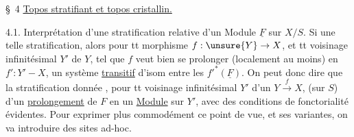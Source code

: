 \S\ 4 \uline{Topos stratifiant et topos cristallin.}

4.1. Interprétation d'une stratification relative d'un Module $\underline{F}$ sur $X/S$.
Si  une telle stratification, alors pour tt morphisme $f:\unsure{Y}\to X$, et tt voisinage infinitésimal $Y'$ de $Y$,   tel que $f$ veut bien se prolonger (localement au moins) en $f':Y'\mathbin{-}X$, un système \uline{transitif} d'isom entre les $f'^*(\underline{F})$.
On peut donc dire que la   stratification   donnée , pour tt voisinage infinitésimal $Y'$ d'un $Y\xrightarrow{f}X$, (sur $S$)  d'un \uline{prolongement}  de $F$ en un \uline{Module} sur $Y'$, avec des conditions de fonctorialité évidentes.
Pour exprimer plus commodément ce point de vue, et ses variantes, on va introduire des sites ad-hoc.

